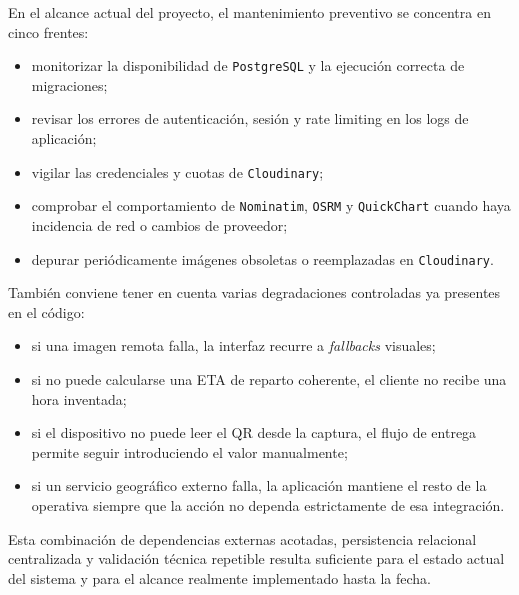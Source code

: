 En el alcance actual del proyecto, el mantenimiento preventivo se concentra en cinco frentes:

\begin{itemize}
    \item monitorizar la disponibilidad de \texttt{PostgreSQL} y la ejecución correcta de migraciones;
    \item revisar los errores de autenticación, sesión y rate limiting en los logs de aplicación;
    \item vigilar las credenciales y cuotas de \texttt{Cloudinary};
    \item comprobar el comportamiento de \texttt{Nominatim}, \texttt{OSRM} y \texttt{QuickChart} cuando haya incidencia de red o cambios de proveedor;
    \item depurar periódicamente imágenes obsoletas o reemplazadas en \texttt{Cloudinary}.
\end{itemize}

También conviene tener en cuenta varias degradaciones controladas ya presentes en el código:

\begin{itemize}
    \item si una imagen remota falla, la interfaz recurre a \textit{fallbacks} visuales;
    \item si no puede calcularse una ETA de reparto coherente, el cliente no recibe una hora inventada;
    \item si el dispositivo no puede leer el QR desde la captura, el flujo de entrega permite seguir introduciendo el valor manualmente;
    \item si un servicio geográfico externo falla, la aplicación mantiene el resto de la operativa siempre que la acción no dependa estrictamente de esa integración.
\end{itemize}

Esta combinación de dependencias externas acotadas, persistencia relacional centralizada y validación técnica repetible resulta suficiente para el estado actual del sistema y para el alcance realmente implementado hasta la fecha.
